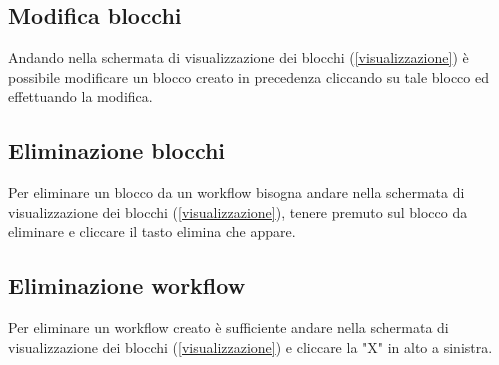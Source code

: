 \subsection{Modifica blocchi}
Andando nella schermata di visualizzazione dei blocchi (\ref{visualizzazione}) è possibile modificare un blocco creato in precedenza cliccando su tale blocco ed effettuando la modifica.
\subsection{Eliminazione blocchi}
Per eliminare un blocco da un workflow bisogna andare nella schermata di visualizzazione dei blocchi (\ref{visualizzazione}), tenere premuto sul blocco da eliminare e cliccare il tasto elimina che appare.
\subsection{Eliminazione workflow}
Per eliminare un workflow creato è sufficiente andare nella schermata di visualizzazione dei blocchi (\ref{visualizzazione}) e cliccare la "X" in alto a sinistra.

\newpage
